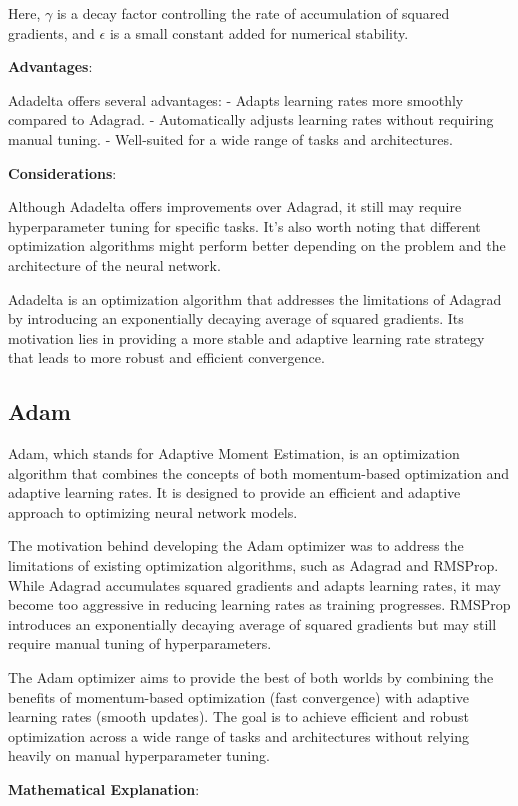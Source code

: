 \documentclass{report}
\begin{document}
Here, \(\gamma\) is a decay factor controlling the rate of accumulation of squared gradients, and \(\epsilon\) is a small constant added for numerical stability.

\textbf{Advantages}:

Adadelta offers several advantages:
- Adapts learning rates more smoothly compared to Adagrad.
- Automatically adjusts learning rates without requiring manual tuning.
- Well-suited for a wide range of tasks and architectures.

\textbf{Considerations}:

Although Adadelta offers improvements over Adagrad, it still may require hyperparameter tuning for specific tasks. It's also worth noting that different optimization algorithms might perform better depending on the problem and the architecture of the neural network.

Adadelta is an optimization algorithm that addresses the limitations of Adagrad by introducing an exponentially decaying average of squared gradients. Its motivation lies in providing a more stable and adaptive learning rate strategy that leads to more robust and efficient convergence.

\subsection{Adam}
Adam, which stands for Adaptive Moment Estimation, is an optimization algorithm that combines the concepts of both momentum-based optimization and adaptive learning rates. It is designed to provide an efficient and adaptive approach to optimizing neural network models.

The motivation behind developing the Adam optimizer was to address the limitations of existing optimization algorithms, such as Adagrad and RMSProp. While Adagrad accumulates squared gradients and adapts learning rates, it may become too aggressive in reducing learning rates as training progresses. RMSProp introduces an exponentially decaying average of squared gradients but may still require manual tuning of hyperparameters.

The Adam optimizer aims to provide the best of both worlds by combining the benefits of momentum-based optimization (fast convergence) with adaptive learning rates (smooth updates). The goal is to achieve efficient and robust optimization across a wide range of tasks and architectures without relying heavily on manual hyperparameter tuning.

\textbf{Mathematical Explanation}:
\end{document}
